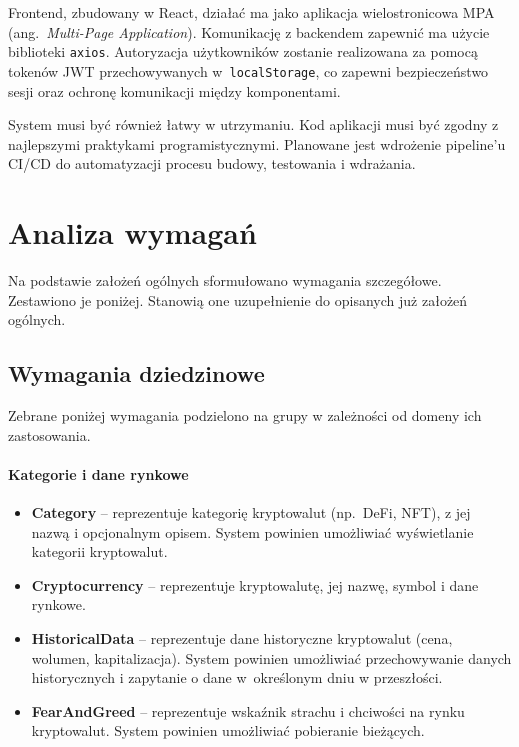 Frontend, zbudowany w React, działać ma jako aplikacja wielostronicowa MPA (ang.~\emph{Multi-Page Application}). Komunikację z backendem zapewnić ma użycie biblioteki \texttt{axios}. Autoryzacja użytkowników zostanie realizowana za pomocą tokenów JWT przechowywanych w~\texttt{localStorage}, co zapewni bezpieczeństwo sesji oraz ochronę komunikacji między komponentami.

System musi być również łatwy w utrzymaniu. Kod aplikacji musi być zgodny z najlepszymi praktykami programistycznymi. Planowane jest wdrożenie pipeline’u CI/CD do automatyzacji procesu budowy, testowania i wdrażania.

\section{Analiza wymagań}
Na podstawie założeń ogólnych sformułowano wymagania szczegółowe. Zestawiono je poniżej. Stanowią one uzupełnienie do opisanych już założeń ogólnych. 
\subsection{Wymagania dziedzinowe}
Zebrane poniżej wymagania podzielono na grupy w zależności od domeny ich zastosowania. %

\paragraph{Kategorie i dane rynkowe}
\begin{itemize}
\item \textbf{Category} -- reprezentuje kategorię kryptowalut (np.\ DeFi, NFT), z jej nazwą i opcjonalnym opisem. System powinien umożliwiać wyświetlanie kategorii kryptowalut.
\item \textbf{Cryptocurrency} -- reprezentuje kryptowalutę, jej nazwę, symbol i dane rynkowe.
\item \textbf{HistoricalData} -- reprezentuje dane historyczne kryptowalut (cena, wolumen, kapitalizacja). System powinien umożliwiać przechowywanie danych historycznych i zapytanie o dane w~określonym dniu w przeszłości.
\item \textbf{FearAndGreed} -- reprezentuje wskaźnik strachu i chciwości na rynku kryptowalut. System powinien umożliwiać pobieranie bieżących.
\end{itemize}

